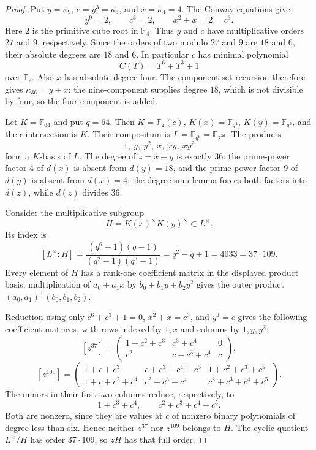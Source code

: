 \documentclass[11pt]{article}
\theoremstyle{definition}
\theoremstyle{remark}
\begin{document}
\begin{proof}
Put $y=\kappa_9$, $c=y^3=\kappa_3$, and $x=\kappa_4=4$.
The Conway equations give
\[
 y^9=2,\qquad c^3=2,\qquad x^2+x=2=c^3.
\]
Here $2$ is the primitive cube root in $\mathbb F_4$. Thus $y$ and $c$
have multiplicative orders $27$ and $9$, respectively. Since the orders of
two modulo $27$ and $9$ are $18$ and $6$, their absolute degrees are
$18$ and $6$. In particular $c$ has minimal polynomial
\[
 C(T)=T^6+T^3+1
\]
over $\mathbb F_2$. Also $x$ has absolute degree four. The component-set
recursion therefore gives $\kappa_{36}=y+x$: the nine-component supplies
degree $18$, which is not divisible by four, so the four-component is added.

Let $K=\mathbb F_{64}$ and put $q=64$. Then $K=\mathbb F_2(c)$,
$K(x)=\mathbb F_{q^2}$, $K(y)=\mathbb F_{q^3}$, and their intersection is
$K$. Their compositum is $L=\mathbb F_{q^6}=\mathbb F_{2^{36}}$.
The products
\[
 1,\ y,\ y^2,\ x,\ xy,\ xy^2
\]
form a $K$-basis of $L$. The degree of $z=x+y$ is exactly $36$:
the prime-power factor $4$ of $d(x)$ is absent from $d(y)=18$, and the
prime-power factor $9$ of $d(y)$ is absent from $d(x)=4$; the degree-sum
lemma forces both factors into $d(z)$, while $d(z)$ divides $36$.

Consider the multiplicative subgroup
\[
 H=K(x)^\times K(y)^\times\subset L^\times.
\]
Its index is
\[
 [L^\times:H]
 =\frac{(q^6-1)(q-1)}{(q^2-1)(q^3-1)}
 =q^2-q+1=4033=37\cdot109.
\]
Every element of $H$ has a rank-one coefficient matrix in the displayed
product basis: multiplication of $a_0+a_1x$ by
$b_0+b_1y+b_2y^2$ gives the outer product
$(a_0,a_1)^{\mathsf T}(b_0,b_1,b_2)$.

Reduction using only
$c^6+c^3+1=0$, $x^2+x=c^3$, and $y^3=c$ gives the following coefficient
matrices, with rows indexed by $1,x$ and columns by $1,y,y^2$:
\[
 [z^{37}]=
 \begin{pmatrix}
 1+c^2+c^3 & c^3+c^4 & 0\\
 c^2 & c+c^3+c^4 & c
 \end{pmatrix},
\]
\[
 [z^{109}]=
 \begin{pmatrix}
 1+c+c^3 & c+c^3+c^4+c^5 & 1+c^2+c^3+c^5\\
 1+c+c^2+c^4 & c^2+c^3+c^4 & c^2+c^3+c^4+c^5
 \end{pmatrix}.
\]
The minors in their first two columns reduce, respectively, to
\[
 1+c^3+c^4,\qquad c^2+c^3+c^4+c^5.
\]
Both are nonzero, since they are values at $c$ of nonzero binary
polynomials of degree less than six. Hence neither $z^{37}$ nor
$z^{109}$ belongs to $H$. The cyclic quotient $L^\times/H$ has order
$37\cdot109$, so $zH$ has that full order.


\end{proof}
\end{document}
